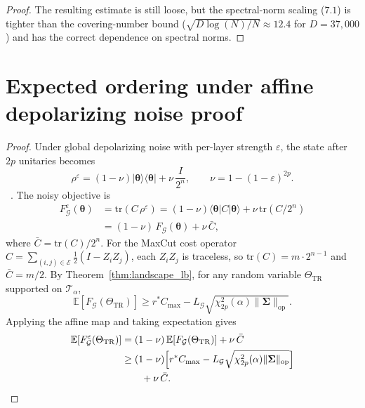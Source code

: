 \documentclass[aps,prx,reprint,superscriptaddress,longbibliography]{revtex4-2}
\newcommand{\ket}[1]{|#1\rangle}
\newcommand{\bra}[1]{\langle#1|}
\newcommand{\calG}{\mathcal{G}}
\newcommand{\calE}{\mathcal{E}}
\newcommand{\calT}{\mathcal{T}}
\newcommand{\bbE}{\mathbb{E}}
\begin{document}
\begin{proof}
The resulting estimate is still loose, but the spectral-norm scaling
($7.1$) is tighter than the covering-number bound
($\sqrt{D\log(N)/N} \approx 12.4$ for $D{=}37{,}000$) and has the
correct dependence on spectral norms.
\end{proof}

\section{Expected ordering under affine depolarizing noise proof}
\label{app:proof_noise}

\begin{proof}
Under global depolarizing noise with per-layer strength
$\varepsilon$, the state after $2p$ unitaries becomes
\begin{equation*}
    \rho^\varepsilon
    = (1-\nu)\ket{\bm\theta}\!\bra{\bm\theta}
    + \nu\,\frac{I}{2^n},
    \qquad
    \nu = 1-(1-\varepsilon)^{2p}.
\end{equation*}
~\cite{wang2021noise}. The noisy objective is
\begin{align*}
    F_\calG^\varepsilon(\bm\theta)
    &= \mathrm{tr}(C\,\rho^\varepsilon)
    = (1-\nu)\bra{\bm\theta}C\ket{\bm\theta}
    + \nu\,\mathrm{tr}(C/2^n) \\
    &= (1-\nu)\,F_\calG(\bm\theta) + \nu\,\bar{C},
\end{align*}
where $\bar{C} = \mathrm{tr}(C)/2^n$.
For the MaxCut cost operator
$C = \sum_{(i,j)\in\calE}\frac{1}{2}(I - Z_iZ_j)$,
each $Z_iZ_j$ is traceless, so
$\mathrm{tr}(C) = m \cdot 2^{n-1}$ and $\bar{C} = m/2$.
By Theorem~\ref{thm:landscape_lb}, for any random variable
$\Theta_{\mathrm{TR}}$ supported on $\calT_\alpha$,
\begin{equation*}
    \bbE[F_\calG(\Theta_{\mathrm{TR}})] \ge r^* C_{\max} - L_\calG
    \sqrt{\chi^2_{2p}(\alpha)\|\bm\Sigma\|_{\mathrm{op}}}.
\end{equation*}
Applying the affine map and taking expectation gives
\begin{align*}
    \bbE[F_\calG^\varepsilon(\Theta_{\mathrm{TR}})]
    &= (1-\nu)\,\bbE[F_\calG(\Theta_{\mathrm{TR}})] + \nu\,\bar{C} \\
    &\ge (1-\nu)\Bigl[
    r^* C_{\max}
    - L_\calG\sqrt{\chi^2_{2p}(\alpha)\|\bm\Sigma\|_{\mathrm{op}}}
    \Bigr] \\
    &\qquad + \nu\,\bar{C}.
\end{align*}

\end{proof}
\end{document}
